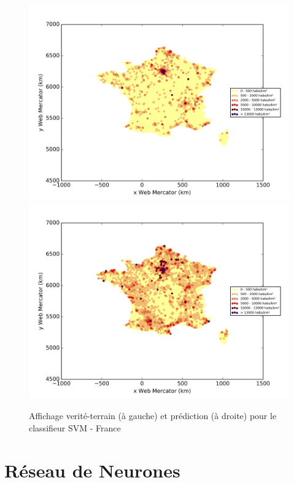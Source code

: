 \documentclass{book}
\begin{document}
\begin{figure}[H]
\centerline{
\includegraphics[scale=0.5]{../../data/France/test/Support_Vector_Gaussian_Classification/Support_Vector_Gaussian_Classification/density_ground_truth.png}
\includegraphics[scale=0.5]{../../data/France/test/Support_Vector_Gaussian_Classification/Support_Vector_Gaussian_Classification/density_classification.png}
}
\caption{Affichage verité-terrain (à gauche) et prédiction (à droite) pour le classifieur SVM - France}
\label{svm_carte}
\end{figure}

\section{Réseau de Neurones}
\end{document}
